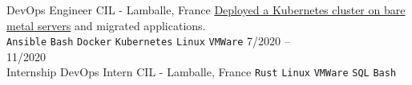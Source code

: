 \documentclass[10pt]{developercv} %
\begin{document}
\begin{entrylist}
		{DevOps Engineer}
		{CIL - Lamballe, France}
		{\href{https://github.com/Ant0wan/VMWare-Kubenetes-cluster}{Deployed a Kubernetes cluster on bare metal servers} and migrated applications.\\
		\texttt{Ansible}\slashsep
		\texttt{Bash}\slashsep
		\texttt{Docker}\slashsep
		\texttt{Kubernetes}\slashsep
		\texttt{Linux}\slashsep
		\texttt{VMWare}
		}
	\entry
		{7/2020 --\\11/2020\\\footnotesize{Internship}}
		{DevOps Intern}
		{CIL - Lamballe, France}
		{
		\texttt{Rust}\slashsep
		\texttt{Linux}\slashsep
		\texttt{VMWare}\slashsep
		\texttt{SQL}\slashsep
		\texttt{Bash}
		}
\end{entrylist}


%


\end{document}
